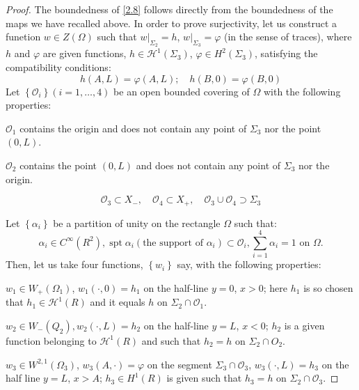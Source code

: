 \documentclass[a4paper,12pt,leqno]{article}
\numberwithin{equation}{section}
\begin{document}
\begin{proof}
	The boundedness of \eqref{2.8} follows directly from the boundedness of the maps we have recalled above. In order to prove surjectivity, let us construct a funetion $w \in Z(\Omega)$ such that $\left.w\right|_{\Sigma_2}=h$, $\left.w\right|_{\Sigma_{3}}=\varphi$ (in the sense of traces), where $h$ and $\varphi$ are given functions, $h \in \mathscr{H}^1\left(\Sigma_{3}\right)$, $\varphi \in H^{2}\left(\Sigma_{3}\right)$, satisfying the compatibility conditions:
\begin{equation} \label{2.9}
	h(A, L)=\varphi(A, L); \quad h(B, 0)=\varphi(B, 0)
\end{equation}
Let $\left\{\mathcal{O}_{i}\right\}(i=1, \ldots, 4)$ be an open bounded covering of $\Omega$ with the following properties:

$\mathcal{O}_{1}$ contains the origin and does not contain any point of $\Sigma_{3}$ nor the point $(0, L)$.

$\mathcal{O}_{2}$ contains the point $(0, L)$ and does not contain any point of $\Sigma_{3}$ nor the origin.

\begin{equation*}
	\mathcal{O}_{3} \subset X_{-}, \quad
	\mathcal{O}_{4} \subset X_{+}, \quad
	\mathcal{O}_{3} \cup \mathcal{O}_{4} \supset \Sigma_{3}
\end{equation*}

\newpage

Let $\left\{\alpha_{i}\right\}$ be a partition of unity on the rectangle $\Omega$ such that: 
\begin{equation*}
	\alpha_{i} \in C^{\infty}\left(R^{2}\right),
	\operatorname{spt} \alpha_{i} (\text{the support of } \alpha_{i}) \subset \mathcal{O}_{i}, \sum_{i=1}^{4} \alpha_{i}=1 \text{ on } \Omega.
\end{equation*}
Then, let us take four functions, $\left\{w_{i}\right\}$ say, with the following properties:

$w_{1} \in W_{+}\left(\Omega_{1}\right)$, $w_{1}(\cdot, 0)=h_{1}$ on the half-line $y=0$, $x>0$; here ${h}_{1}$ is so chosen that $h_{1} \in \mathscr{H}^1(R)$ and it equals $h$ on $\Sigma_{2} \cap \mathcal{O}_{1}$. 

$w_{2} \in W_{-}\left(Q_{2}\right), w_{2}(\cdot, L)=h_{2}$ on the half-line $y=L$, $x<0$; $h_{2}$ is a given function belonging to $\mathscr{H}^{1}(R)$ and such that $h_{2}=h$ on $\Sigma_{2} \cap O_{2}$.

$w_{3} \in W^{2,1}\left(\Omega_{3}\right)$, $w_{3}(A, \cdot)=\varphi$ on the segment $\Sigma_{3} \cap \mathcal{O}_{3}$,
$w_{3}(\cdot, L)=h_{3}$ on the half line $y=L$, $x>A$;
$h_3 \in H^1(R)$ is given such that $h_{3}=h$ on $\Sigma_{2} \cap \mathcal{O}_{3}$.


\end{proof}
\end{document}
